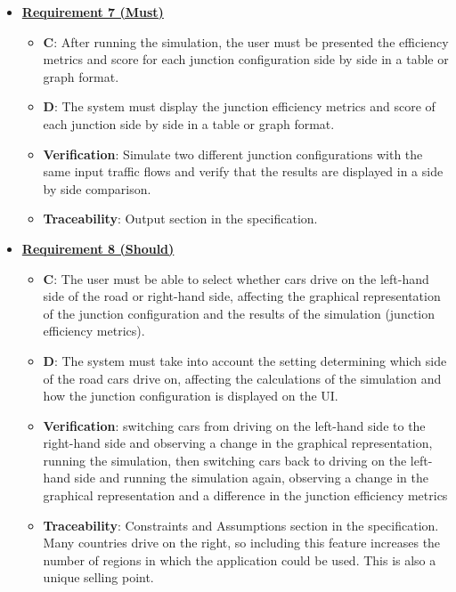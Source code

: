 \documentclass{article}
\begin{document}
\begin{itemize}
    \item \textbf{\underline{Requirement 7 (Must)}}
    \begin{itemize}
        \item \textbf{C}: After running the simulation, the user must be presented the efficiency metrics 
        and score for each junction configuration side by side in a table or graph format.
        \item \textbf{D}: The system must display the junction efficiency metrics and score of each junction 
        side by side in a table or graph format.
        \item \textbf{Verification}: Simulate two different junction configurations with the same 
            input traffic flows and verify that the results are displayed in a side by side comparison.
        \item\textbf{Traceability}: Output section in the specification.
    \end{itemize}

    \item \textbf{\underline{Requirement 8 (Should)}}
    \begin{itemize}
        \item \textbf{C}: The user must be able to select whether cars drive on the left-hand side of 
            the road or right-hand side, affecting the graphical representation of the junction
            configuration and the results of the simulation (junction efficiency metrics).
        \item \textbf{D}: The system must take into account the setting determining which side of
            the road cars drive on, affecting the calculations of the simulation and how 
            the junction configuration is displayed on the UI.
        \item \textbf{Verification}: switching cars from driving on the left-hand side to the 
            right-hand side and observing a change in the graphical representation, running 
            the simulation, then switching cars back to driving on the left-hand side and 
            running the simulation again, observing a change in the graphical representation 
            and a difference in the junction efficiency metrics
        \item\textbf{Traceability}: Constraints and Assumptions section in the specification.
            Many countries drive on the right, so including this feature increases the number 
            of regions in which the application could be used. This is also a unique selling point.
    \end{itemize}


\end{itemize}
\end{document}
